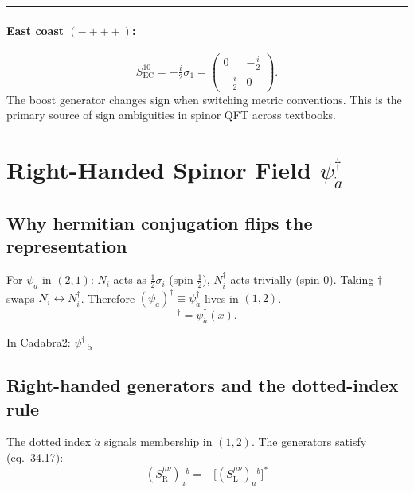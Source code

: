 \documentclass[12pt]{article}
\newcommand{\psidag}{\psi^{\dagger}}
\begin{document}
\medskip\noindent\rule{\linewidth}{0.4pt}\medskip

\paragraph{East coast $(-{+}{+}{+})$:}
\[
  S^{10}_{\mathrm{EC}} = -\tfrac{i}{2}\sigma_1
  = \begin{pmatrix}0 & -\tfrac{i}{2} \\ -\tfrac{i}{2} & 0\end{pmatrix}.
\]
The boost generator changes sign when switching metric conventions.
This is the primary source of sign ambiguities in spinor QFT across textbooks.

\section{Right-Handed Spinor Field
         \texorpdfstring{$\psidag_{\dot{a}}$}{psi-dagger}}

\subsection{Why hermitian conjugation flips the representation}

For $\psi_a$ in $(2,1)$:
$N_i$ acts as $\tfrac{1}{2}\sigma_i$ (spin-$\tfrac{1}{2}$),
$N^\dagger_i$ acts trivially (spin-$0$).
Taking $\dagger$ swaps $N_i \leftrightarrow N^\dagger_i$.
Therefore $(\psi_a)^\dagger \equiv \psidag_{\dot{a}}$ lives in $(1,2)$.
\begin{equation}
  [\psi_a(x)]^\dagger = \psidag_{\dot{a}}(x).
  \tag{34.11}
\end{equation}

\noindent In Cadabra2: $\psi^{\dagger}\,_{\dot{\alpha}}$

\subsection{Right-handed generators and the dotted-index rule}

The dotted index $\dot{a}$ signals membership in $(1,2)$.
The generators satisfy (eq.~34.17):
\begin{equation}
  \boxed{(S^{\mu\nu}_{\mathrm{R}})_{\dot{a}}{}^{\dot{b}}
  = -\bigl[(S^{\mu\nu}_{\mathrm{L}})_a{}^b\bigr]^*}
  \tag{34.17}
\end{equation}
\end{document}
